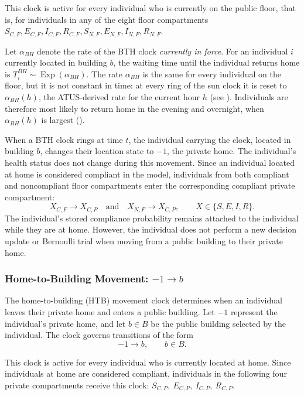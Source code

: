 \documentclass[11pt]{article}
\theoremstyle{definition}
\theoremstyle{plain}
\begin{document}
This clock is active for every individual who is currently on the public floor, that is, for individuals in any of the eight floor compartments $S_{C,F},E_{C,F},I_{C,F},R_{C,F},S_{N,F},E_{N,F},I_{N,F},R_{N,F}$.

Let $\alpha_{BH}$ denote the rate of the BTH clock \emph{currently in force}. For an individual $i$ currently located in building $b$, the waiting time until the individual returns home is $T_i^{BH}\sim\operatorname{Exp}(\alpha_{BH})$. The rate $\alpha_{BH}$ is the same for every individual on the floor, but it is not constant in time: at every ring of the sun clock it is reset to $\alpha_{BH}(h)$, the ATUS-derived rate for the current hour $h$ (see ). Individuals are therefore most likely to return home in the evening and overnight, when $\alpha_{BH}(h)$ is largest ().

When a BTH clock rings at time $t$, the individual carrying the clock, located in building $b$, changes their location state to $-1$, the private home. The individual's health status does not change during this movement. Since an individual located at home is considered compliant in the model, individuals from both compliant and noncompliant floor compartments enter the corresponding compliant private compartment:
\[
X_{C,F}\longrightarrow X_{C,P}
\quad\text{and}\quad
X_{N,F}\longrightarrow X_{C,P},
\qquad X\in\{S,E,I,R\}.
\]
The individual's stored compliance probability remains attached to the individual while they are at home. However, the individual does not perform a new decision update or Bernoulli trial when moving from a public building to their private home.

\subsubsection{Home-to-Building Movement: \texorpdfstring{$-1\rightarrow b$}{home to b}}
\label{sec:htb}

The home-to-building (HTB) movement clock determines when an individual leaves their private home and enters a public building. Let $-1$ represent the individual's private home, and let $b\in B$ be the public building selected by the individual. The clock governs transitions of the form
\begin{equation}
-1\longrightarrow b,
\qquad  b\in B.
\end{equation}

This clock is active for every individual who is currently located at home. Since individuals at home are considered compliant, individuals in the following four private compartments receive this clock: $S_{C,P},\ E_{C,P},\ I_{C,P},\ R_{C,P}$.
\end{document}
